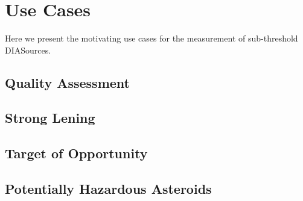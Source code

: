 \section{Use Cases}\label{sec:usecases}

Here we present the motivating use cases for the measurement of sub-threshold DIASources.

\subsection{Quality Assessment}\label{ssec:qa}

\subsection{Strong Lening}\label{ssec:sl}

\subsection{Target of Opportunity}\label{ssec:too}

\subsection{Potentially Hazardous Asteroids}\label{ssec:pha}
